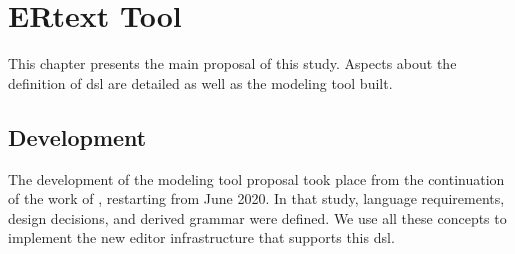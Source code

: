 \chapter{ERtext Tool} \label{chap:ERtext}

This chapter presents the main proposal of this study.
Aspects about the definition of \ac{dsl} are detailed as well as the modeling tool built.

\section{Development} \label{sec_tool:development}

The development of the modeling tool proposal took place from the continuation of the work of \cite{Lopes:2019}, restarting from June 2020.
In that study, language requirements, design decisions, and derived grammar were defined.
We use all these concepts to implement the new editor infrastructure that supports this \ac{dsl}.

